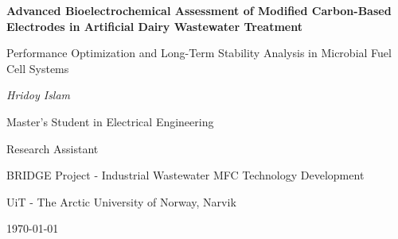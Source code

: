\documentclass[12pt,a4paper]{article}
\begin{document}
\begin{titlepage}
    \centering
    \vspace*{2cm}
    
    {\huge\bfseries Advanced Bioelectrochemical Assessment of Modified Carbon-Based Electrodes in Artificial Dairy Wastewater Treatment\par}
    
    \vspace{1cm}
    {\Large Performance Optimization and Long-Term Stability Analysis in Microbial Fuel Cell Systems\par}
    
    \vspace{2cm}
    {\Large\itshape Hridoy Islam\par}
    
    \vspace{1cm}
    {\large Master's Student in Electrical Engineering\par}
    {\large Research Assistant\par}
    
    \vspace{2cm}
    {\large BRIDGE Project - Industrial Wastewater MFC Technology Development\par}
    {\large UiT - The Arctic University of Norway, Narvik\par}
    
    \vspace{2cm}
    {\large\today\par}
    
    \vfill
    
    \begin{abstract}
    This comprehensive study presents an in-depth electrochemical performance evaluation of four distinct electrode configurations in microbial fuel cell systems treating high-strength artificial dairy wastewater over an extended 302-hour operational period. The investigation focused on a carbon black-modified stainless steel mesh (10\% CB-SSM) electrode compared against commercial Toray carbon paper, conventional carbon paper, and pristine stainless steel mesh under industrially relevant conditions. Using artificial dairy wastewater with exceptionally high organic loading (COD: 5,302 mg/L), the modified CB-SSM electrode demonstrated superior treatment efficiency achieving 73\% COD removal while maintaining electrochemical stability. The study reveals critical insights into long-term electrode behavior, biofilm dynamics, and treatment-energy generation trade-offs essential for industrial-scale implementation.
    \end{abstract}
    
\end{titlepage}
\end{document}
